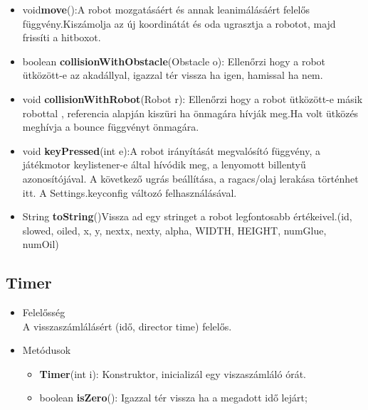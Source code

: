 \begin{itemize}
\begin{itemize}
		\item void\textbf{move}():A robot mozgatásáért és annak leanimálásáért felelős függvény.Kiszámolja az új koordinátát és oda ugrasztja a robotot, majd frissíti a hitboxot.
		\item boolean \textbf{collisionWithObstacle}(Obstacle o): Ellenőrzi hogy a robot ütközött-e az akadállyal, igazzal tér vissza ha igen, hamissal ha nem.
		\item void \textbf{collisionWithRobot}(Robot r): Ellenőrzi hogy a robot ütközött-e másik robottal ,  referencia alapján kiszüri ha önmagára hívják meg.Ha volt ütközés meghívja a bounce függvényt önmagára.
		\item void \textbf{keyPressed}(int e):A robot irányítását megvalósító függvény, a játékmotor keylistener-e által hívódik meg, a lenyomott billentyű azonosítójával. A következő ugrás beállítása, a ragacs/olaj lerakása történhet itt. A Settings.keyconfig változó felhasználásával.
				\item String \textbf{toString}()Vissza ad egy stringet a robot legfontosabb értékeivel.(id, slowed, oiled, x, y, nextx, nexty, alpha, WIDTH, HEIGHT, numGlue, numOil)
	\end{itemize}
\end{itemize}

\subsection{Timer}
\begin{itemize}
\item Felelősség\\
A visszaszámlálásért (idő, director time) felelős.
\item Metódusok
	\begin{itemize}
		\item \textbf{Timer}(int i): Konstruktor, inicializál egy viszaszámláló órát.
		\item boolean \textbf{isZero}(): Igazzal tér vissza ha a megadott idő lejárt;
	\end{itemize}
\end{itemize}

